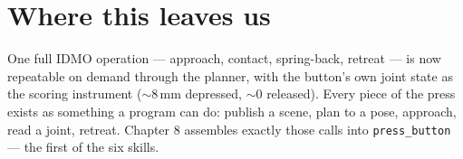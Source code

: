 \section{Where this leaves us}

One full IDMO operation --- approach, contact, spring-back, retreat --- is now repeatable on
demand through the planner, with the button's own joint state as the scoring instrument
(${\sim}8$\,mm depressed, ${\sim}0$ released). Every piece of the press exists as something a
program can do: publish a scene, plan to a pose, approach, read a joint, retreat. Chapter 8
assembles exactly those calls into \texttt{press\_button} --- the first of the six skills.
